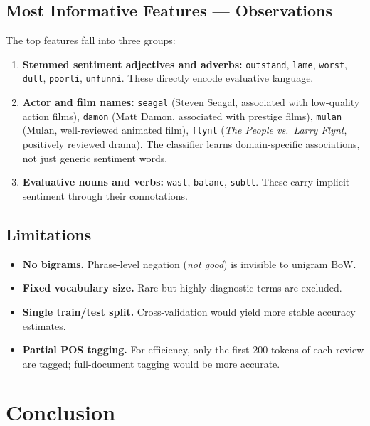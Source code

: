 \documentclass[11pt,a4paper]{article}
\begin{document}
\subsection{Most Informative Features --- Observations}

The top features fall into three groups:
\begin{enumerate}[noitemsep]
  \item \textbf{Stemmed sentiment adjectives and adverbs:} \texttt{outstand},
        \texttt{lame}, \texttt{worst}, \texttt{dull}, \texttt{poorli}, \texttt{unfunni}.
        These directly encode evaluative language.
  \item \textbf{Actor and film names:} \texttt{seagal} (Steven Seagal, associated with
        low-quality action films), \texttt{damon} (Matt Damon, associated with prestige
        films), \texttt{mulan} (Mulan, well-reviewed animated film), \texttt{flynt}
        (\emph{The People vs.\ Larry Flynt}, positively reviewed drama). The classifier
        learns domain-specific associations, not just generic sentiment words.
  \item \textbf{Evaluative nouns and verbs:} \texttt{wast}, \texttt{balanc},
        \texttt{subtl}. These carry implicit sentiment through their connotations.
\end{enumerate}

\subsection{Limitations}

\begin{itemize}[noitemsep]
  \item \textbf{No bigrams.} Phrase-level negation (\emph{not good}) is invisible to
        unigram BoW.
  \item \textbf{Fixed vocabulary size.} Rare but highly diagnostic terms are excluded.
  \item \textbf{Single train/test split.} Cross-validation would yield more stable
        accuracy estimates.
  \item \textbf{Partial POS tagging.} For efficiency, only the first 200 tokens of each
        review are tagged; full-document tagging would be more accurate.
\end{itemize}

\section{Conclusion}
\end{document}
